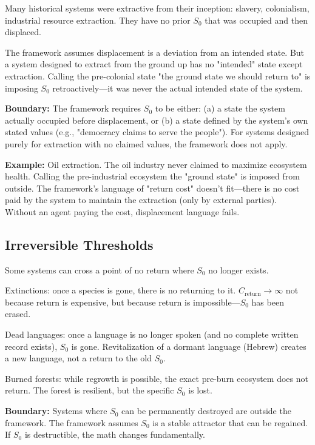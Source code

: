 \documentclass[12pt]{article}
\begin{document}
Many historical systems were extractive from their inception: slavery, colonialism, industrial resource extraction. They have no prior $S_0$ that was occupied and then displaced.

The framework assumes displacement is a deviation from an intended state. But a system designed to extract from the ground up has no "intended" state except extraction. Calling the pre-colonial state "the ground state we should return to" is imposing $S_0$ retroactively—it was never the actual intended state of the system.

\textbf{Boundary:} The framework requires $S_0$ to be either: (a) a state the system actually occupied before displacement, or (b) a state defined by the system's own stated values (e.g., "democracy claims to serve the people"). For systems designed purely for extraction with no claimed values, the framework does not apply.

\textbf{Example:} Oil extraction. The oil industry never claimed to maximize ecosystem health. Calling the pre-industrial ecosystem the "ground state" is imposed from outside. The framework's language of "return cost" doesn't fit—there is no cost paid by the system to maintain the extraction (only by external parties). Without an agent paying the cost, displacement language fails.

\subsection{Irreversible Thresholds}

Some systems can cross a point of no return where $S_0$ no longer exists.

Extinctions: once a species is gone, there is no returning to it. $C_{\text{return}} \to \infty$ not because return is expensive, but because return is impossible—$S_0$ has been erased.

Dead languages: once a language is no longer spoken (and no complete written record exists), $S_0$ is gone. Revitalization of a dormant language (Hebrew) creates a new language, not a return to the old $S_0$.

Burned forests: while regrowth is possible, the exact pre-burn ecosystem does not return. The forest is resilient, but the specific $S_0$ is lost.

\textbf{Boundary:} Systems where $S_0$ can be permanently destroyed are outside the framework. The framework assumes $S_0$ is a stable attractor that can be regained. If $S_0$ is destructible, the math changes fundamentally.
\end{document}
